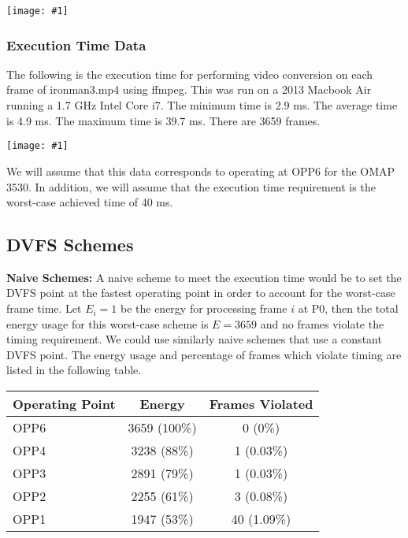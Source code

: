 \documentclass[11pt, letterpaper]{article}
\providecommand{\fig}[1]{
		\noindent
		\begin{center}
			\texttt{[image: \#1]}
		\end{center}
	}
\providecommand{\figcol}[1]{
    \noindent
    \begin{center}
      \texttt{[image: \#1]}
    \end{center}
  }
\begin{document}

\fig{dvfs_energy.pdf}

\subsubsection{Execution Time Data}

The following is the execution time for performing video conversion on each
frame of ironman3.mp4 using ffmpeg. This was run on a 2013 Macbook Air running a 1.7 GHz Intel Core i7. The minimum time is 2.9 ms. The average
time is 4.9 ms. The maximum time is 39.7 ms. There are 3659 frames.
\figcol{frame_time.pdf}

We will assume that this data corresponds to operating at OPP6 for the OMAP
3530. In addition, we will assume that the execution time requirement is the
worst-case achieved time of 40 ms.

\subsection{DVFS Schemes}

\textbf{Naive Schemes: }
A naive scheme to meet the execution time would be to set the DVFS point at the
fastest operating point in order to account for the worst-case frame time. Let
$E_i = 1$ be the energy for processing frame $i$ at P0, then the total energy
usage for this worst-case scheme is $E = 3659$ and no frames violate the timing
requirement. We could use similarly naive schemes that use a constant DVFS
point. The energy usage and percentage of frames which violate timing are
listed in the following table.

\begin{tabular}{|l|c|c|}
\hline
Operating Point & Energy & Frames Violated \\ \hline\hline
OPP6 & 3659 (100\%) & 0 (0\%) \\ \hline
OPP4 & 3238 (88\%) & 1 (0.03\%) \\ \hline
OPP3 & 2891 (79\%) & 1 (0.03\%) \\ \hline
OPP2 & 2255 (61\%) & 3 (0.08\%) \\ \hline
OPP1 & 1947 (53\%) & 40 (1.09\%) \\ \hline
\end{tabular}
\end{document}
